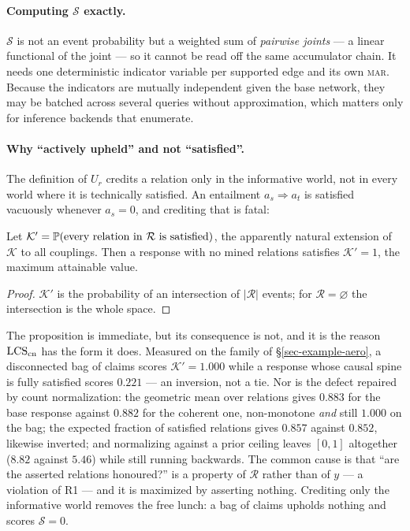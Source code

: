 \paragraph{Computing $\mathcal{S}$ exactly.} $\mathcal{S}$ is not an event probability but a weighted
sum of \emph{pairwise joints} --- a linear functional of the joint --- so it cannot be read off the
same accumulator chain. It needs one deterministic indicator variable per supported edge and its own
\textsc{mar}. Because the indicators are mutually independent given the base network, they may be
batched across several queries without approximation, which matters only for inference backends that
enumerate.

\paragraph{Why ``actively upheld'' and not ``satisfied''.} The definition of $U_r$ credits a relation
only in the informative world, not in every world where it is technically satisfied. An entailment
$a_s\Rightarrow a_t$ is satisfied vacuously whenever $a_s=0$, and crediting that is fatal:

\begin{proposition}
\label{prop-vacuous}
Let $\mathcal{K}'=\mathbb{P}\!\left( \text{every relation in }\mathcal{R}\text{ is satisfied} \right)$, the apparently
natural extension of $\mathcal{K}$ to all couplings. Then a response with no mined relations
satisfies $\mathcal{K}'=1$, the maximum attainable value.
\end{proposition}

\begin{proof}
$\mathcal{K}'$ is the probability of an intersection of $|\mathcal{R}|$ events; for
$\mathcal{R}=\varnothing$ the intersection is the whole space.
\end{proof}

The proposition is immediate, but its consequence is not, and it is the reason
$\mathrm{LCS}_{\mathrm{cn}}$ has the form it does. Measured on the family of \S\ref{sec-example-aero}, a disconnected
bag of claims scores $\mathcal{K}'=1.000$ while a response whose causal spine is fully satisfied
scores $0.221$ --- an inversion, not a tie. Nor is the defect repaired by count normalization: the
geometric mean over relations gives $0.883$ for the base response against $0.882$ for the coherent
one, non-monotone \emph{and} still $1.000$ on the bag; the expected fraction of satisfied relations
gives $0.857$ against $0.852$, likewise inverted; and normalizing against a prior ceiling leaves
$[0,1]$ altogether ($8.82$ against $5.46$) while still running backwards. The common cause is that
``are the asserted relations honoured?'' is a property of $\mathcal{R}$ rather than of $y$ --- a
violation of R1 --- and it is maximized by asserting nothing. Crediting only the informative world
removes the free lunch: a bag of claims upholds nothing and scores $\mathcal{S}=0$.


